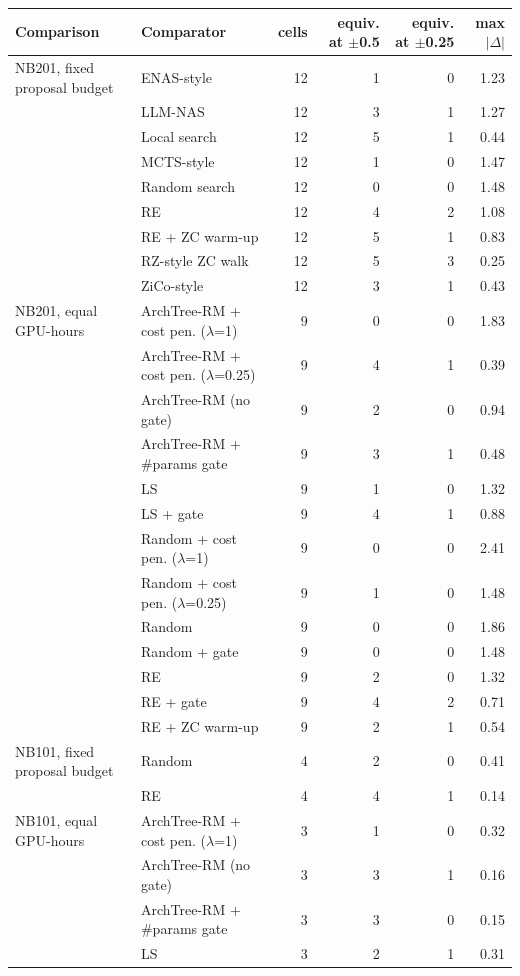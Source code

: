 \begin{tabular}{@{}llrrrr@{}}
\toprule
Comparison & Comparator & cells & equiv. at $\pm$0.5 & equiv. at $\pm$0.25 & max $|\Delta|$\\
\midrule
NB201, fixed proposal budget & ENAS-style & 12 & 1 & 0 & 1.23\\
 & LLM-NAS & 12 & 3 & 1 & 1.27\\
 & Local search & 12 & 5 & 1 & 0.44\\
 & MCTS-style & 12 & 1 & 0 & 1.47\\
 & Random search & 12 & 0 & 0 & 1.48\\
 & RE & 12 & 4 & 2 & 1.08\\
 & RE + ZC warm-up & 12 & 5 & 1 & 0.83\\
 & RZ-style ZC walk & 12 & 5 & 3 & 0.25\\
 & ZiCo-style & 12 & 3 & 1 & 0.43\\
\midrule
NB201, equal GPU-hours & ArchTree-RM + cost pen. ($\lambda$=1) & 9 & 0 & 0 & 1.83\\
 & ArchTree-RM + cost pen. ($\lambda$=0.25) & 9 & 4 & 1 & 0.39\\
 & ArchTree-RM (no gate) & 9 & 2 & 0 & 0.94\\
 & ArchTree-RM + \#params gate & 9 & 3 & 1 & 0.48\\
 & LS & 9 & 1 & 0 & 1.32\\
 & LS + gate & 9 & 4 & 1 & 0.88\\
 & Random + cost pen. ($\lambda$=1) & 9 & 0 & 0 & 2.41\\
 & Random + cost pen. ($\lambda$=0.25) & 9 & 1 & 0 & 1.48\\
 & Random & 9 & 0 & 0 & 1.86\\
 & Random + gate & 9 & 0 & 0 & 1.48\\
 & RE & 9 & 2 & 0 & 1.32\\
 & RE + gate & 9 & 4 & 2 & 0.71\\
 & RE + ZC warm-up & 9 & 2 & 1 & 0.54\\
\midrule
NB101, fixed proposal budget & Random & 4 & 2 & 0 & 0.41\\
 & RE & 4 & 4 & 1 & 0.14\\
\midrule
NB101, equal GPU-hours & ArchTree-RM + cost pen. ($\lambda$=1) & 3 & 1 & 0 & 0.32\\
 & ArchTree-RM (no gate) & 3 & 3 & 1 & 0.16\\
 & ArchTree-RM + \#params gate & 3 & 3 & 0 & 0.15\\
 & LS & 3 & 2 & 1 & 0.31\\

\end{tabular}
